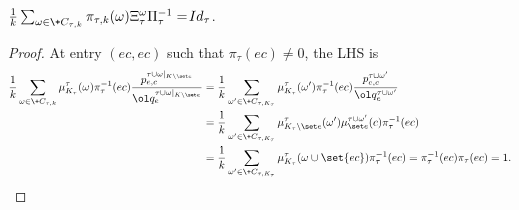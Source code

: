 \documentclass[a4paper,11pt]{article}
\begin{document}
\begin{lemma}\label{lem:bound-Xi-Pi}
$ \frac{1}{k}\sum_{\omega\in \+C_{\tau, k}}\pi_{\tau, k}(\omega)\Xi^\omega_\tau\Pi^{-1}_\tau = \!{Id}_\tau$.
\end{lemma}
\begin{proof}
    At entry $(ec, ec)$ such that $\pi_\tau(ec)\neq 0$, the LHS is
	\begin{align*}
        \frac{1}{k} \sum_{\omega\in \+C_{\tau, k}}\mu^\tau_{K_\tau}(\omega) \pi^{-1}_\tau(ec)
                      \frac{p^{\tau\cup\omega|_{K\setminus \set e}}_{e, c}}
                       {\ol q^{\tau\cup\omega|_{K\setminus \set e}}_{e   }}
        &= 
        \frac{1}{k} \sum_{\omega'\in \+C_{\tau, K_\tau}}\mu^\tau_{K_\tau}(\omega') \pi^{-1}_\tau(ec)
                      \frac{p^{\tau\cup\omega'}_{e, c}}
                       {\ol q^{\tau\cup\omega'}_{e   }}
      \\&= 
        \frac{1}{k} \sum_{\omega'\in \+C_{\tau, K_\tau}}\mu^\tau_{K_\tau\setminus\set e}(\omega')
                      \mu^{\tau\cup\omega'}_{\set e}(c)
                    \pi^{-1}_\tau(ec)
      \\&= 
        \frac{1}{k} \sum_{\omega'\in \+C_{\tau, K_\tau}}\mu^\tau_{K_\tau}(\omega\cup\set{ec})
                    \pi^{-1}_\tau(ec)
         = 
        \pi^{-1}_\tau(ec) \pi_\tau(ec)
        =1.
	\end{align*}
\end{proof}
\end{document}
